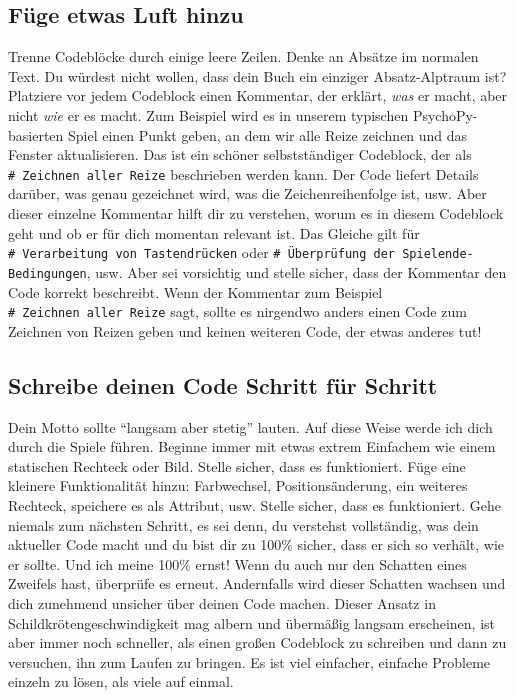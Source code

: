 \documentclass[
]{book}
\begin{document}
\hypertarget{fuxfcge-etwas-luft-hinzu}{%
\subsection{Füge etwas Luft hinzu}\label{fuxfcge-etwas-luft-hinzu}}

Trenne Codeblöcke durch einige leere Zeilen. Denke an Absätze im normalen Text. Du würdest nicht wollen, dass dein Buch ein einziger Absatz-Alptraum ist? Platziere vor jedem Codeblock einen Kommentar, der erklärt, \emph{was} er macht, aber nicht \emph{wie} er es macht. Zum Beispiel wird es in unserem typischen PsychoPy-basierten Spiel einen Punkt geben, an dem wir alle Reize zeichnen und das Fenster aktualisieren. Das ist ein schöner selbstständiger Codeblock, der als \texttt{\#\ Zeichnen\ aller\ Reize} beschrieben werden kann. Der Code liefert Details darüber, was genau gezeichnet wird, was die Zeichenreihenfolge ist, usw. Aber dieser einzelne Kommentar hilft dir zu verstehen, worum es in diesem Codeblock geht und ob er für dich momentan relevant ist.
Das Gleiche gilt für \texttt{\#\ Verarbeitung\ von\ Tastendrücken} oder \texttt{\#\ Überprüfung\ der\ Spielende-Bedingungen}, usw. Aber sei vorsichtig und stelle sicher, dass der Kommentar den Code korrekt beschreibt. Wenn der Kommentar zum Beispiel \texttt{\#\ Zeichnen\ aller\ Reize} sagt, sollte es nirgendwo anders einen Code zum Zeichnen von Reizen geben und keinen weiteren Code, der etwas anderes tut!

\hypertarget{schreibe-deinen-code-schritt-fuxfcr-schritt}{%
\subsection{Schreibe deinen Code Schritt für Schritt}\label{schreibe-deinen-code-schritt-fuxfcr-schritt}}

Dein Motto sollte ``langsam aber stetig'' lauten. Auf diese Weise werde ich dich durch die Spiele führen. Beginne immer mit etwas extrem Einfachem wie einem statischen Rechteck oder Bild. Stelle sicher, dass es funktioniert. Füge eine kleinere Funktionalität hinzu: Farbwechsel, Positionsänderung, ein weiteres Rechteck, speichere es als Attribut, usw. Stelle sicher, dass es funktioniert. Gehe niemals zum nächsten Schritt, es sei denn, du verstehst vollständig, was dein aktueller Code macht und du bist dir zu 100\% sicher, dass er sich so verhält, wie er sollte. Und ich meine 100\% ernst! Wenn du auch nur den Schatten eines Zweifels hast, überprüfe es erneut. Andernfalls wird dieser Schatten wachsen und dich zunehmend unsicher über deinen Code machen. Dieser Ansatz in Schildkrötengeschwindigkeit mag albern und übermäßig langsam erscheinen, ist aber immer noch schneller, als einen großen Codeblock zu schreiben und dann zu versuchen, ihn zum Laufen zu bringen. Es ist viel einfacher, einfache Probleme einzeln zu lösen, als viele auf einmal.
\end{document}

